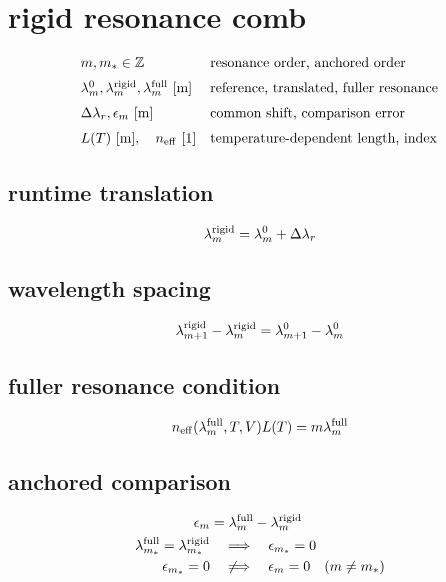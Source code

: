 \documentclass[11pt]{article}
\begin{document}
\clearpage
\section*{rigid resonance comb}
\[
\begin{array}{ll}m,m_*\in\mathbb Z&\text{resonance order, anchored order}\\[0.6em]\lambda_m^0,\lambda_m^{\rm rigid},\lambda_m^{\rm full}\ [\mathrm m]&\text{reference, translated, fuller resonance}\\[0.6em]\Delta\lambda_r,\epsilon_m\ [\mathrm m]&\text{common shift, comparison error}\\[0.6em]L(T)\ [\mathrm m],\quad n_{\rm eff}\ [1]&\text{temperature-dependent length, index}\end{array}
\]
\subsection*{runtime translation}
\[
\displaystyle \lambda_m^{\rm rigid}=\lambda_m^0+\Delta\lambda_r
\]
\subsection*{wavelength spacing}
\[
\displaystyle \lambda_{m+1}^{\rm rigid}-\lambda_m^{\rm rigid}=\lambda_{m+1}^0-\lambda_m^0
\]
\subsection*{fuller resonance condition}
\[
\displaystyle n_{\rm eff}(\lambda_m^{\rm full},T,V)L(T)=m\lambda_m^{\rm full}
\]
\subsection*{anchored comparison}
\[
\displaystyle \begin{aligned}\epsilon_m&=\lambda_m^{\rm full}-\lambda_m^{\rm rigid}\\\lambda_{m_*}^{\rm full}=\lambda_{m_*}^{\rm rigid}&\quad\Longrightarrow\quad\epsilon_{m_*}=0\\\epsilon_{m_*}=0&\quad\not\Longrightarrow\quad\epsilon_m=0\quad(m\ne m_*)\end{aligned}
\]

\clearpage
\end{document}
